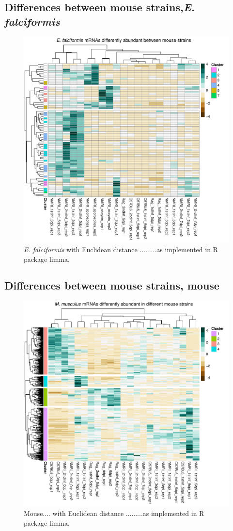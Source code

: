 \documentclass{article}
\begin{document}
\subsection{Differences between mouse strains,\textit{E. falciformis}}
\begin{figure}[H]
\begin{center}
\includegraphics[width=\textwidth]{EfStrainHeatmap.pdf}  
	\caption{\textit{E. falciformis} with Euclidean distance .........as implemented in R package limma.}
\end{center}
\end{figure}

\subsection{Differences between mouse strains, mouse}
\begin{figure}[H]
\begin{center}
\includegraphics[width=\textwidth]{MmStrainHeatmap.pdf}  
	\caption{Mouse.... with Euclidean distance .........as implemented in R package limma.}
\end{center}
\end{figure}
\end{document}
